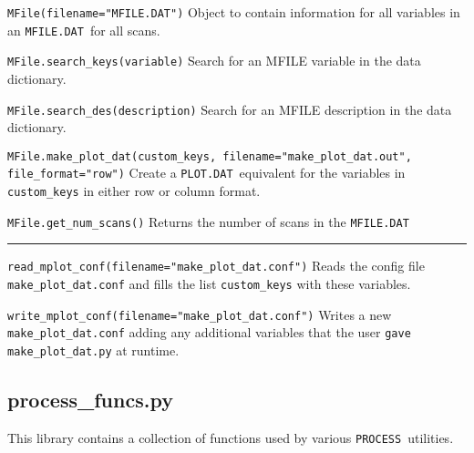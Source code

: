 \documentclass[11pt,a4paper]{article}
\newcommand{\mfile}{\mbox{\texttt{MFILE.DAT}}}
\newcommand{\plotdat}{\mbox{\texttt{PLOT.DAT}}}
\newcommand{\process}{\mbox{\texttt{PROCESS}}}
\begin{document}
\begin{description}

\item{\verb|MFile(filename="MFILE.DAT")|} Object to contain information for
  all variables in an \mfile\ for all scans.

\item{\verb|MFile.search_keys(variable)|} Search for an MFILE variable in the
  data dictionary.

\item{\verb|MFile.search_des(description)|} Search for an MFILE description in
  the data dictionary.

\item{\verb|MFile.make_plot_dat(custom_keys, filename="make_plot_dat.out", file_format="row")|}
  Create a \plotdat\ equivalent for the variables in \verb|custom_keys| in
  either row or column format.

\item{\verb|MFile.get_num_scans()|} Returns the number of scans in the
  \mfile

\end{description}

\rule{\textwidth}{0.4pt}

\begin{description}

\item{\verb|read_mplot_conf(filename="make_plot_dat.conf")|} Reads the config
  file \verb|make_plot_dat.conf| and fills the list \verb|custom_keys| with
  these variables.

\item{\verb|write_mplot_conf(filename="make_plot_dat.conf")|} Writes a new
  \verb|make_plot_dat.conf| adding any additional variables that the user
  \verb|gave make_plot_dat.py| at runtime.

\end{description}

\subsection{process\_funcs.py}

This library contains a collection of functions used by various \process\
utilities.
\end{document}
